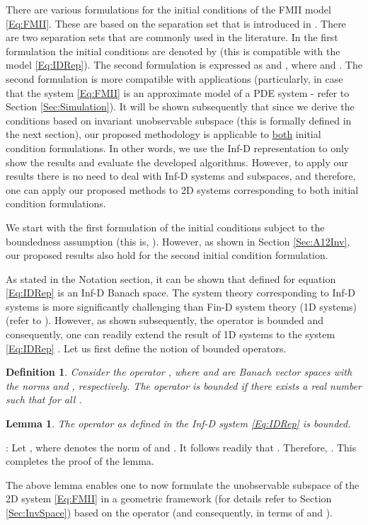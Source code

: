 \documentclass[journal,12pt,draftcls,onecolumn]{IEEEtran}
\def\QEDclosed{\hfill\IEEEQEDclosed}
\renewcommand{\qed}{\QEDclosed}
\renewenvironment{proof}[1][\proofname]{\noindent\nobreakspace{\bfseries #1}:\;}{\qed\par}
\newcommand{\myhl}[1]{{#1}}
\newtheorem{lemma}{Lemma}
\newtheorem{definition}{Definition}
\begin{document}
There are various formulations for the initial conditions  of the FMII model \eqref{Eq:FMII}. These are based on the separation set that is introduced in \cite{FM_SeparationSet}. There are two separation sets that are commonly used in the literature.  In the first formulation
the initial conditions are denoted by  \cite{FMinBook} (this is compatible with the model \eqref{Eq:IDRep}). The second formulation is expressed as  and , where  and  \cite{Kaczorek_Book}.
The second formulation is more compatible with applications (particularly, in case that the system \eqref{Eq:FMII} is an approximate model of a PDE system - refer to Section \ref{Sec:Simulation}). It will be shown subsequently that  since we derive the conditions based on invariant unobservable subspace (this is formally defined in the next section), our proposed methodology is applicable to \underline{both} initial condition formulations. In other words, we use the Inf-D  representation  to only show the results and evaluate the developed algorithms. However, to apply our results there is no need to deal with Inf-D systems and subspaces, and therefore, one can apply our proposed methods to 2D systems corresponding to both initial condition formulations. 

\myhl{We start with the first formulation of the initial} conditions subject to the boundedness assumption (this is, ). However, as shown in Section \ref{Sec:A12Inv}, our proposed results also hold for  the second initial condition formulation.

As stated in the Notation section, it can be  shown that  defined for equation \eqref{Eq:IDRep} is an Inf-D Banach space. The system theory corresponding to Inf-D systems is more significantly challenging than Fin-D system theory (1D systems) (refer to \cite{Zwart_Book}). However, as shown subsequently, the operator  is bounded and consequently, one can readily extend the result of 1D systems to the system \eqref{Eq:IDRep} \cite{Curtain_Book,Zwart_Book}. Let us first define the notion of bounded operators.
\begin{definition}\label{{Def:BoundedOp}}\cite{Curtain_Book}
	Consider the operator , where  and  are Banach vector spaces  with the norms  and , respectively. The operator  is bounded if there exists a real number  such that  for all .
\end{definition}
\begin{lemma}\label{Lem:Boundedness}
	The operator  as defined in the Inf-D system \eqref{Eq:IDRep} is bounded.
\end{lemma}
\begin{proof}
	Let , where  denotes the norm of  and . It follows readily that .
	Therefore, . This completes the proof of the lemma.
\end{proof}
The above lemma enables one to now formulate the unobservable subspace of the 2D system \eqref{Eq:FMII} in a geometric framework (for details refer to Section \ref{Sec:InvSpace}) based on the operator  (and consequently, in terms of  and ).
\end{document}
